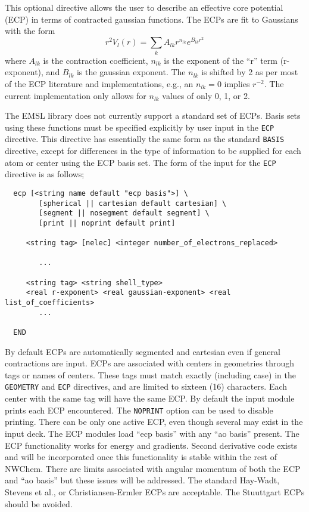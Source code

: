 \label{sec:ecp}

This optional directive allows the user to describe an effective core
potential (ECP) in terms of contracted gaussian functions.  The ECPs
are fit to Gaussians with the form
\[
 r^2V_l(r) = \sum_{k} A_{lk} r^{n_{lk}} e^{B_{lk}r^{2}}
\]
where $A_{lk}$ is the contraction coefficient, $n_{lk}$ is the
exponent of the ``r'' term (r-exponent), and $B_{lk}$ is the gaussian
exponent.  The $n_{lk}$ is shifted by 2 as per most of the ECP
literature and implementations, e.g., an $n_{lk} = 0$ implies
$r^{-2}$.  The current implementation only allows for $n_{lk}$ values
of only 0, 1, or 2. 

The EMSL library does not currently support a standard set of ECPs.
Basis sets using these functions must be specified explicitly by user
input in the \verb+ECP+ directive.  This directive has essentially the
same form as the standard \verb+BASIS+ directive, except for
differences in the type of information to be supplied for each atom or
center using the ECP basis set.  The form of the input for the
\verb+ECP+ directive is as follows;

\begin{verbatim}
  ecp [<string name default "ecp basis">] \
        [spherical || cartesian default cartesian] \
        [segment || nosegment default segment] \
        [print || noprint default print]

     <string tag> [nelec] <integer number_of_electrons_replaced>
 
        ...

     <string tag> <string shell_type>
     <real r-exponent> <real gaussian-exponent> <real list_of_coefficients>
        ...
     
  END
\end{verbatim}    

By default ECPs are automatically segmented and cartesian even if
general contractions are input.  ECPs are associated with centers in
geometries through tags or names of centers.  These tags must match
exactly (including case) in the \verb+GEOMETRY+ and \verb+ECP+
directives, and are limited to sixteen (16) characters.  Each center
with the same tag will have the same ECP.  By default the input module
prints each ECP encountered.  The \verb+NOPRINT+ option can be used to
disable printing.  There can be only one active ECP, even though
several may exist in the input deck.  The ECP modules load ``ecp
basis'' with any ``ao basis'' present.  The ECP functionality works
for energy and gradients.  Second derivative code exists and will be
incorporated once this functionality is stable within the rest of
NWChem.  There are limits associated with angular momentum of both the
ECP and ``ao basis'' but these issues will be addressed. The standard
Hay-Wadt, Stevens et al., or Christiansen-Ermler ECPs are acceptable.
The Stuuttgart ECPs should be avoided.

